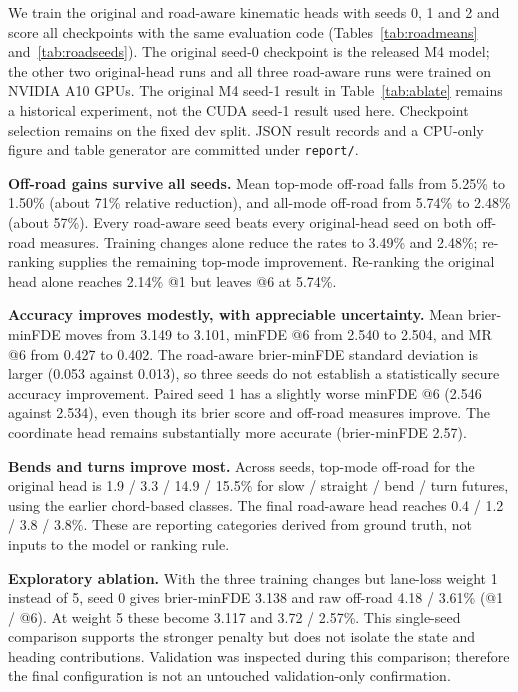 \documentclass[conference]{IEEEtran}
\begin{document}
We train the original and road-aware kinematic heads with seeds 0, 1 and 2 and score all checkpoints
with the same evaluation code (Tables~\ref{tab:roadmeans} and~\ref{tab:roadseeds}). The original
seed-0 checkpoint is the released M4 model; the other two original-head runs and all three
road-aware runs were trained on NVIDIA A10 GPUs. The original M4 seed-1 result in
Table~\ref{tab:ablate} remains a historical experiment, not the CUDA seed-1 result used here.
Checkpoint selection remains on the fixed dev split. JSON result records and a CPU-only figure
and table generator are committed under \texttt{report/}.

\textbf{Off-road gains survive all seeds.} Mean top-mode off-road falls from 5.25\% to 1.50\%
(about 71\% relative reduction), and all-mode off-road from 5.74\% to 2.48\% (about 57\%). Every
road-aware seed beats every original-head seed on both off-road measures. Training changes alone
reduce the rates to 3.49\% and 2.48\%; re-ranking supplies the remaining top-mode improvement.
Re-ranking the original head alone reaches 2.14\% @1 but leaves @6 at 5.74\%.

\textbf{Accuracy improves modestly, with appreciable uncertainty.} Mean brier-minFDE moves from
3.149 to 3.101, minFDE @6 from 2.540 to 2.504, and MR @6 from 0.427 to 0.402. The road-aware
brier-minFDE standard deviation is larger (0.053 against 0.013), so three seeds do not establish a
statistically secure accuracy improvement. Paired seed 1 has a slightly worse minFDE @6 (2.546
against 2.534), even though its brier score and off-road measures improve. The coordinate head
remains substantially more accurate (brier-minFDE 2.57).

\textbf{Bends and turns improve most.} Across seeds, top-mode off-road for the original head is
1.9 / 3.3 / 14.9 / 15.5\% for slow / straight / bend / turn futures, using the earlier chord-based
classes. The final road-aware head reaches 0.4 / 1.2 / 3.8 / 3.8\%. These are reporting categories
derived from ground truth, not inputs to the model or ranking rule.

\textbf{Exploratory ablation.} With the three training changes but lane-loss weight 1 instead of 5,
seed 0 gives brier-minFDE 3.138 and raw off-road 4.18 / 3.61\% (@1 / @6). At weight 5 these become
3.117 and 3.72 / 2.57\%. This single-seed comparison supports the stronger penalty but does not
isolate the state and heading contributions. Validation was inspected during this comparison;
therefore the final configuration is not an untouched validation-only confirmation.
\end{document}
